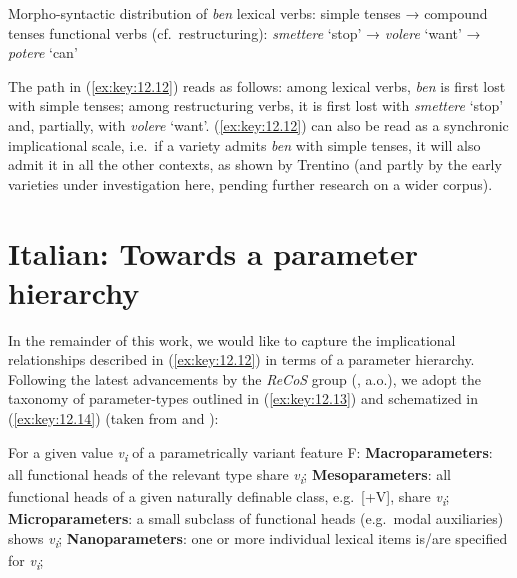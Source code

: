 \documentclass[output=paper]{langsci/langscibook}
\begin{document}
\ea\label{ex:key:12.12} Morpho-syntactic distribution of \emph{ben}
	\ea lexical verbs: simple tenses → compound tenses
    \ex functional verbs (cf.\ restructuring): \emph{smettere} ‘stop’ →
        \emph{volere} ‘want’ → \emph{potere} ‘can’
	\z
\z

The path in (\ref{ex:key:12.12}) reads as follows: among lexical verbs, \emph{ben} is first
lost with simple tenses; among restructuring verbs, it is first lost with
\emph{smettere} ‘stop’ and, partially, with \emph{volere} ‘want’. (\ref{ex:key:12.12}) can also
be read as a synchronic implicational scale, i.e.\ if a variety admits
\emph{ben} with simple tenses, it will also admit it in all the other contexts,
as shown by Trentino (and partly by the early varieties under investigation
here, pending further research on a wider corpus).

\section{Italian: Towards a parameter hierarchy}\label{sec:23-hierarchy}

In the remainder of this work, we would like to capture the implicational
relationships described in (\ref{ex:key:12.12}) in terms of a parameter hierarchy. Following
the latest advancements by the \emph{ReCoS} group
(\citealt{Roberts2012,BibRob2012,BibRob2015,BibRob2016,BibHolRobShee2014,BibRobShee2014},
a.o.), we adopt the taxonomy of parameter-types outlined in (\ref{ex:key:12.13}) and
schematized in (\ref{ex:key:12.14}) (taken from \citealt{BibRob2012} and
\citealt{BibRob2016}):

\ea\label{ex:key:12.13} For a given value \emph{v\textsubscript{i}} of a parametrically variant feature F:
	\ea \textbf{Macroparameters}: all functional heads of the relevant type share \emph{v\textsubscript{i}};
	\ex \textbf{Mesoparameters}: all functional heads of a given naturally definable class, e.g.\ [+V], share \emph{v\textsubscript{i}};
	\ex \textbf{Microparameters}: a small subclass of functional heads (e.g.\ modal auxiliaries) shows \emph{v\textsubscript{i}};
	\ex \textbf{Nanoparameters}: one or more individual lexical items is/are specified for \emph{v\textsubscript{i}};
	\z
\z
\end{document}

